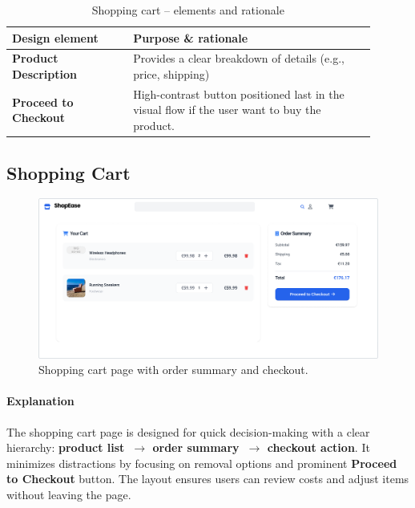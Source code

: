 \documentclass[12pt]{article}
\begin{document}
	\begin{table}[H]
		\centering
		\caption{Shopping cart – elements and rationale}
		\begin{tabular}{p{0.30\linewidth} p{0.60\linewidth}}
			\hline
			\textbf{Design element} 	 & Purpose \& rationale \\
			\hline
			\textbf{Product Description} & Provides a clear breakdown of details (e.g., price, shipping)  \\
			\textbf{Proceed to Checkout} & High-contrast button positioned last in the visual flow if the user want to buy the product. \\
			\hline
		\end{tabular}\label{tab:table}
	\end{table}


	\subsection{Shopping Cart}\label{subsec:shopping-cart}

	\begin{figure}[H]
		\centering
		\includegraphics[width=\linewidth]{pictures/main/ShoppingCart_Figma}%
		\caption{Shopping cart page with order summary and checkout.}
		\label{fig:ui-cart}
	\end{figure}

	\paragraph{Explanation}%
	The shopping cart page is designed for quick decision-making with a clear hierarchy:
	\textbf{product list~$\rightarrow$ order summary~$\rightarrow$ checkout action}. It minimizes distractions
	by focusing on removal options and prominent \textbf{Proceed to Checkout} button.
	The layout ensures users can review costs and adjust items without leaving the page.
\end{document}
